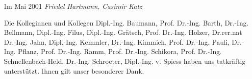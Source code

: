 \vskip 0.2cm \noindent Im Mai 2001  \hfill {\it Friedel Hartmann, Casimir Katz}\\

\begin{acknowledgement}
Die Kolleginnen und Kollegen
Dipl.-Ing. Baumann, Prof. Dr.-Ing. Barth, Dr.-Ing. Bellmann, Dipl.-Ing. Filus, Dipl.-Ing. Gr\"{a}tsch,
Prof. Dr.-Ing. Holzer, Dr.rer.nat Dr.-Ing. Jahn, Dipl.-Ing. Kemmler, Dr.-Ing. Kimmich, Prof. Dr.-Ing. Pauli, Dr.-Ing. Pflanz,
Prof. Dr.-Ing. Ramm, Prof. Dr.-Ing. Schikora, Prof. Dr.-Ing. Schnellenbach-Held,
Dr.-Ing. Schroeter, Dipl.-Ing. v. Spiess
haben uns tatkr\"{a}ftig unterst\"{u}tzt. Ihnen gilt unser besonderer Dank.\\
\end{acknowledgement}
